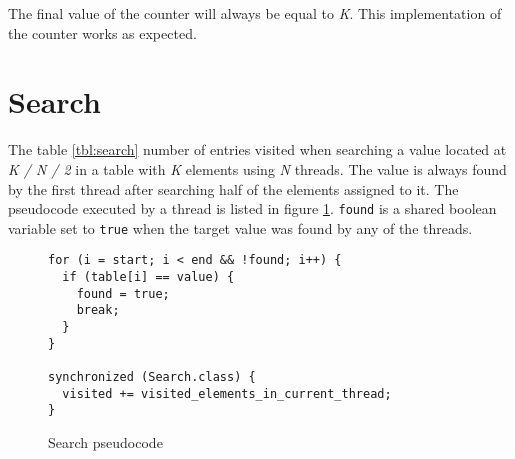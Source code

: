 \documentclass[12pt]{article}
\begin{document}
The final value of the counter will always be equal to \emph{K}. This
implementation of the counter works as expected.


\newpage
\section{Search}

\begin{table}[h!]
  \centering
  \small

  \caption{Number of visited entries for variable N and K = 100.000.000 on a 4 logical
  cores processor. Reported values are averaged over 7 runs.}
  \label{tbl:search}
\end{table}

The table \ref{tbl:search} number of entries visited when searching a value
located at \emph{K / N / 2} in a table with \emph{K} elements using \emph{N}
threads. The value is always found by the first thread after searching half of
the elements assigned to it. The pseudocode executed by a thread is
listed in figure \ref{fig:search-pseudocode}. \texttt{found} is a shared
boolean variable set to \texttt{true} when the target value was
found by any of the threads.

\begin{figure}[h!]
  \begin{Verbatim}[frame=single]
for (i = start; i < end && !found; i++) {                                    
  if (table[i] == value) {                                                   
    found = true;                                                            
    break;                                                                   
  }                                                                          
}                                                                            
                                                                             
synchronized (Search.class) {                                                
  visited += visited_elements_in_current_thread;
}
  \end{Verbatim}
  \caption{Search pseudocode}
  \label{fig:search-pseudocode}
\end{figure}
\end{document}
